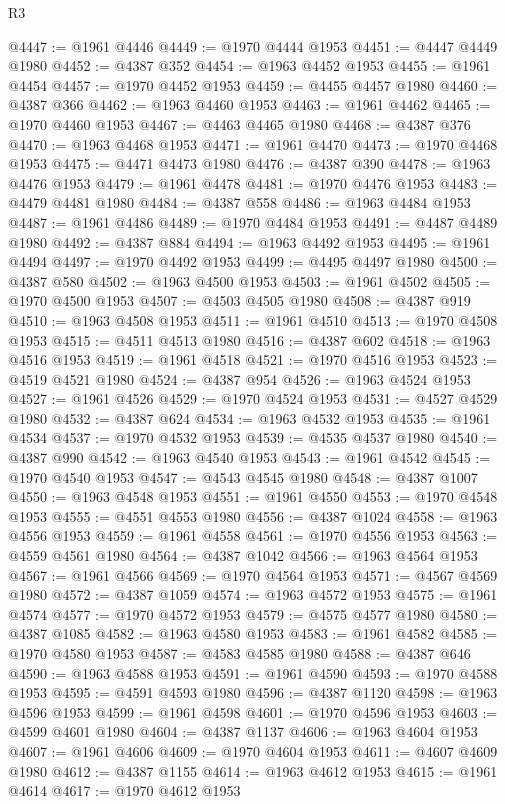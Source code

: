 \begin{lexlean}{R3}
\begin{coremodule}
@4447 := @1961 @4446
@4449 := @1970 @4444 @1953
@4451 := @4447 @4449 @1980
@4452 := @4387 @352
@4454 := @1963 @4452 @1953
@4455 := @1961 @4454
@4457 := @1970 @4452 @1953
@4459 := @4455 @4457 @1980
@4460 := @4387 @366
@4462 := @1963 @4460 @1953
@4463 := @1961 @4462
@4465 := @1970 @4460 @1953
@4467 := @4463 @4465 @1980
@4468 := @4387 @376
@4470 := @1963 @4468 @1953
@4471 := @1961 @4470
@4473 := @1970 @4468 @1953
@4475 := @4471 @4473 @1980
@4476 := @4387 @390
@4478 := @1963 @4476 @1953
@4479 := @1961 @4478
@4481 := @1970 @4476 @1953
@4483 := @4479 @4481 @1980
@4484 := @4387 @558
@4486 := @1963 @4484 @1953
@4487 := @1961 @4486
@4489 := @1970 @4484 @1953
@4491 := @4487 @4489 @1980
@4492 := @4387 @884
@4494 := @1963 @4492 @1953
@4495 := @1961 @4494
@4497 := @1970 @4492 @1953
@4499 := @4495 @4497 @1980
@4500 := @4387 @580
@4502 := @1963 @4500 @1953
@4503 := @1961 @4502
@4505 := @1970 @4500 @1953
@4507 := @4503 @4505 @1980
@4508 := @4387 @919
@4510 := @1963 @4508 @1953
@4511 := @1961 @4510
@4513 := @1970 @4508 @1953
@4515 := @4511 @4513 @1980
@4516 := @4387 @602
@4518 := @1963 @4516 @1953
@4519 := @1961 @4518
@4521 := @1970 @4516 @1953
@4523 := @4519 @4521 @1980
@4524 := @4387 @954
@4526 := @1963 @4524 @1953
@4527 := @1961 @4526
@4529 := @1970 @4524 @1953
@4531 := @4527 @4529 @1980
@4532 := @4387 @624
@4534 := @1963 @4532 @1953
@4535 := @1961 @4534
@4537 := @1970 @4532 @1953
@4539 := @4535 @4537 @1980
@4540 := @4387 @990
@4542 := @1963 @4540 @1953
@4543 := @1961 @4542
@4545 := @1970 @4540 @1953
@4547 := @4543 @4545 @1980
@4548 := @4387 @1007
@4550 := @1963 @4548 @1953
@4551 := @1961 @4550
@4553 := @1970 @4548 @1953
@4555 := @4551 @4553 @1980
@4556 := @4387 @1024
@4558 := @1963 @4556 @1953
@4559 := @1961 @4558
@4561 := @1970 @4556 @1953
@4563 := @4559 @4561 @1980
@4564 := @4387 @1042
@4566 := @1963 @4564 @1953
@4567 := @1961 @4566
@4569 := @1970 @4564 @1953
@4571 := @4567 @4569 @1980
@4572 := @4387 @1059
@4574 := @1963 @4572 @1953
@4575 := @1961 @4574
@4577 := @1970 @4572 @1953
@4579 := @4575 @4577 @1980
@4580 := @4387 @1085
@4582 := @1963 @4580 @1953
@4583 := @1961 @4582
@4585 := @1970 @4580 @1953
@4587 := @4583 @4585 @1980
@4588 := @4387 @646
@4590 := @1963 @4588 @1953
@4591 := @1961 @4590
@4593 := @1970 @4588 @1953
@4595 := @4591 @4593 @1980
@4596 := @4387 @1120
@4598 := @1963 @4596 @1953
@4599 := @1961 @4598
@4601 := @1970 @4596 @1953
@4603 := @4599 @4601 @1980
@4604 := @4387 @1137
@4606 := @1963 @4604 @1953
@4607 := @1961 @4606
@4609 := @1970 @4604 @1953
@4611 := @4607 @4609 @1980
@4612 := @4387 @1155
@4614 := @1963 @4612 @1953
@4615 := @1961 @4614
@4617 := @1970 @4612 @1953

\end{coremodule}
\end{lexlean}
